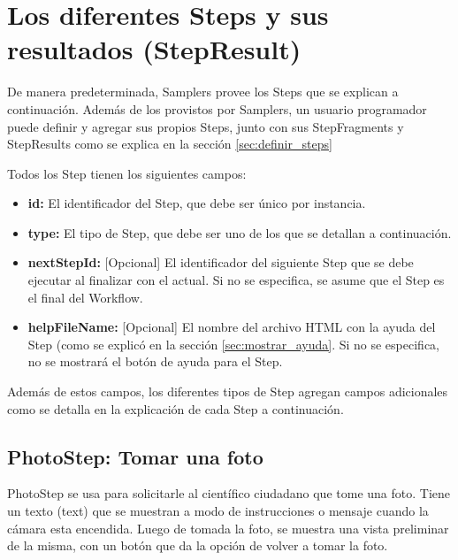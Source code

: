 \section{Los diferentes Steps y sus resultados (StepResult)} \label{sec:steps_detallados}
De manera predeterminada, Samplers provee los Steps que se explican a continuación. Además de los provistos por Samplers, un usuario programador puede definir y agregar sus propios Steps, junto con sus StepFragments y StepResults como se explica en la sección \ref{sec:definir_steps} 

Todos los Step tienen los siguientes campos:

\begin{itemize}
\item \textbf{id:} El identificador del Step, que debe ser único por instancia.
\item \textbf{type:} El tipo de Step, que debe ser uno de los que se detallan a continuación.
\item \textbf{nextStepId:} [Opcional] El identificador del siguiente Step que se debe ejecutar al finalizar con el actual. Si no se especifica, se asume que el Step es el final del Workflow.
\item \textbf{helpFileName:} [Opcional] El nombre del archivo HTML con la ayuda del Step (como se explicó en la sección \ref{sec:mostrar_ayuda}. Si no se especifica, no se mostrará el botón de ayuda para el Step.
\end{itemize}

Además de estos campos, los diferentes tipos de Step agregan campos adicionales como se detalla en la explicación de cada Step a continuación.


\subsection{PhotoStep: Tomar una foto}
PhotoStep se usa para solicitarle al científico ciudadano que tome una foto. Tiene un texto (text) que se muestran a modo de instrucciones o mensaje cuando la cámara esta encendida. Luego de tomada la foto, se muestra una vista preliminar de la misma, con un botón que da la opción de volver a tomar la foto.

